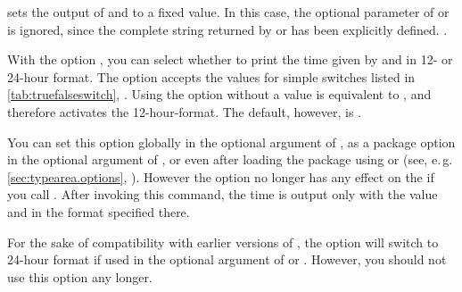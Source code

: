 \begin{Declaration}%
\end{Declaration}%
 sets the output of  and
 to a fixed value. In this case, the optional
parameter of  or 
is ignored, since the complete string returned by
 or  has been
explicitly defined. .%
\EndIndexGroup


\begin{Declaration}
\end{Declaration}%
%
With the  option , you can
select whether to print the time given by  and
 in 12- or 24-hour format. The option accepts
the values for simple switches listed in \autoref{tab:truefalseswitch},
. Using the option without a value is
equivalent to , and therefore activates the
12-hour-format. The default, however, is .

You can set this option globally in the optional argument of
, as a package option in the optional
argument of , or even after loading the
package using  or
 (see, e.\,g. \autoref{sec:typearea.options},
). However the option no longer has any
effect on the if you call . After invoking this
command, the time is output only with the value and in the format specified
there.

For the sake of compatibility with earlier versions of
, the option  will switch to 24-hour format if
used in the optional argument of  or .
However, you should not use this option any longer.%
\EndIndexGroup
%
\EndIndexGroup

\endinput

